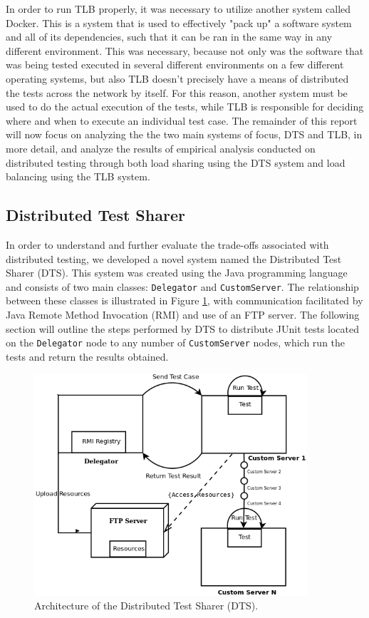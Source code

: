 \documentclass{article}
\begin{document}
{In order to run TLB properly, it was necessary to utilize another system called Docker. This is a system that is used to effectively "pack up" a software system and all of its dependencies, such that it can be ran in the same way in any different environment. This was necessary, because not only was the software that was being tested executed in several different environments on a few different operating systems, but also TLB doesn't precisely have a means of distributed the tests across the network by itself. For this reason, another system must be used to do the actual execution of the tests, while TLB is responsible for deciding where and when to execute an individual test case. The remainder of this report will now focus on analyzing the the two main systems of focus, DTS and TLB, in more detail, and analyze the results of empirical analysis conducted on distributed testing through both load sharing using the DTS system and load balancing using the TLB system.

\subsection{Distributed Test Sharer}
\label{sharer}
In order to understand and further evaluate the trade-offs associated with distributed testing, we developed a novel system named the Distributed Test Sharer (DTS).  This system was created using the Java programming language and consists of two main classes: \texttt{Delegator} and \texttt{CustomServer}.  The relationship between these classes is illustrated in Figure \ref{dtsdiagram}, with communication facilitated by Java Remote Method Invocation (RMI) and use of an FTP server.  The following section will outline the steps performed by DTS to distribute JUnit tests located on the \texttt{Delegator} node to any number of \texttt{CustomServer} nodes, which run the tests and return the results obtained.

\begin{figure}[H]
\includegraphics[width = 0.9\textwidth]{DTS_Diagram.png}
\caption{Architecture of the Distributed Test Sharer (DTS).}
\label{dtsdiagram}
\end{figure}

}
\end{document}
